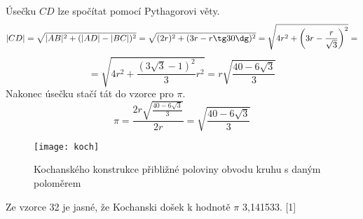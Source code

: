 \documentclass[soc]{gzwroc} %
\begin{document}
Úsečku $CD$ lze spočítat pomocí Pythagorovi věty.
$$ |CD|=\sqrt{|AB|^2+(|AD|-|BC|)^2}=\sqrt{(2r)^2+(3r-r\tg 30\dg)^2} = \sqrt{4r^2+\left(3r-\frac{r}{\sqrt{3}}\right)^2}= $$
\begin{equation}
=\sqrt{4r^2+\frac{(3\sqrt{3}-1)^2}{3}r^2} = r\sqrt{\frac{40-6\sqrt{3}}{3}}
\end{equation}
Nakonec úsečku stačí tát do vzorce pro $\pi$.
\begin{equation}
\pi=\frac{2r\sqrt{\frac{40-6\sqrt{3}}{3}}}{2r}=\sqrt{\frac{40-6\sqrt{3}}{3}}
\end{equation}
\begin{figure}[!ht]
\texttt{[image: koch]}
\caption{Kochanského konstrukce přibližné poloviny obvodu kruhu s daným poloměrem}
\label{fig:kruh}
\end{figure}
Ze vzorce 32 je jasné, že Kochanski došek k hodnotě $\pi$ 3,141533. [1]
\end{document}

